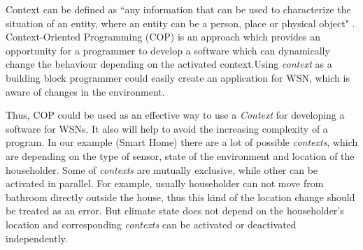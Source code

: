 \documentclass{ubicomp-ext}
\begin{document}

Context can be defined as ``any information that can be used to characterize the situation of an entity, where an entity can be a person, place or physical object" \cite{dey99}. Context-Oriented Programming (COP) \cite{hirschfeld08} is an approach which provides an opportunity for a programmer to develop a software which can dynamically change the behaviour depending on the activated context.Using \textit{context} as a building block programmer could easily create an application for WSN, which is aware of changes in the environment.

Thus, COP could be used as an effective way to use a \textit{Context} for developing a software for WSNs. It also will help to avoid the increasing complexity of a program. In our example (Smart Home) there are a lot of possible \textit{contexts}, which are depending on the type of sensor, state of the environment and location of the householder. Some of \textit{contexts} are mutually exclusive, while other can be activated in parallel. For example, usually householder can not move from bathroom directly outside the house, thus this kind of the location change should be treated as an error. But climate state does not depend on the householder's location and corresponding \textit{contexts} can be activated or deactivated independently.
\end{document}
